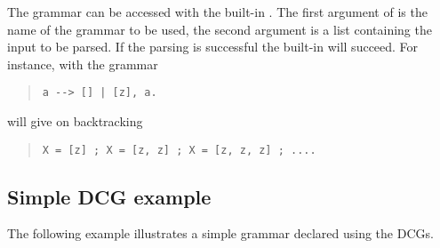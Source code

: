 The grammar can be accessed with the built-in
.
The first argument of  is
the name of the
grammar to be used, the
second argument is a list containing the input to be parsed. If the
parsing is successful the built-in will succeed.
For instance, with the grammar
\begin{quote}
\begin{verbatim}
a --> [] | [z], a.
\end{verbatim}
\end{quote}
 will give on backtracking
\begin{quote}
\begin{verbatim}
X = [z] ; X = [z, z] ; X = [z, z, z] ; ....
\end{verbatim}
\end{quote}

\subsection{Simple DCG example}

The following example illustrates a simple grammar declared using the DCGs.

